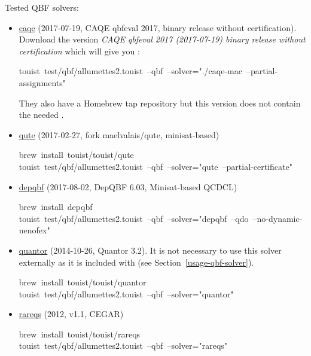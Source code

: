\noindent Tested QBF solvers:%

\begin{itemize}%

\item{}
\href{https://www.react.uni-saarland.de/tools/caqe/index.html}{caqe} (2017-07-19, CAQE qbfeval 2017, binary release without certification).
Download the version \emph{CAQE qbfeval 2017 (2017-07-19) binary release without certification}
which will give you :%
\begin{mdpre}%
\noindent touist~test/qbf/allumettes2.touist~--qbf~--solver="./caqe-mac~--partial-assignments"%
\end{mdpre}
They also have a Homebrew tap repository but this version does not contain
the needed .%

\item{}
\href{https://github.com/perebor/qute}{qute} (2017-02-27, fork maelvalais/qute, minisat-based)%
\begin{mdpre}%
\noindent brew~install~touist/touist/qute\\
touist~test/qbf/allumettes2.touist~--qbf~--solver="qute~--partial-certificate"%
\end{mdpre}%

\item{}
\href{http://lonsing.github.io/depqbf/}{depqbf} (2017-08-02, DepQBF 6.03, Minisat-based QCDCL)%
\begin{mdpre}%
\noindent brew~install~depqbf\\
touist~test/qbf/allumettes2.touist~--qbf~--solver="depqbf~--qdo~--no-dynamic-nenofex"%
\end{mdpre}%

\item{}
\href{http://fmv.jku.at/quantor/}{quantor} (2014-10-26, Quantor 3.2). It is not necessary to use this
solver externally as it is included with  (see Section~\ref{usage-qbf-solver}).%
\begin{mdpre}%
\noindent brew~install~touist/touist/quantor\\
touist~test/qbf/allumettes2.touist~--qbf~--solver="quantor"%
\end{mdpre}%

\item{}
\href{http://sat.inesc-id.pt/~mikolas/sw/areqs/}{rareqs} (2012, v1.1, CEGAR)%
\begin{mdpre}%
\noindent brew~install~touist/touist/rareqs\\
touist~test/qbf/allumettes2.touist~--qbf~--solver="rareqs"%
\end{mdpre}%
\end{itemize}%


